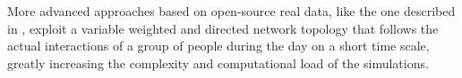 \documentclass[DIV=12, BCOR=0pt]{scrartcl}  %
\begin{document}
	More advanced approaches based on open-source real data, like the one described in \citet{Firth2020}, exploit a variable weighted and directed network topology that follows the actual interactions of a group of people during the day on a short time scale, greatly increasing the complexity and computational load of the simulations.


 
%		
  \footnotesize
	
\end{document}
